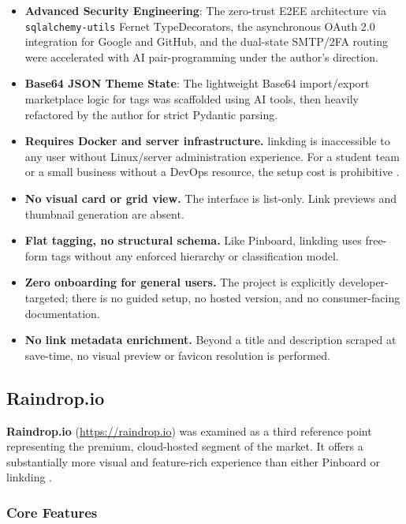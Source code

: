 \documentclass[11pt,a4paper]{book}
\begin{document}
\begin{itemize}
  \item \textbf{Advanced Security Engineering}: The zero-trust E2EE architecture via \texttt{sqlalchemy-utils} Fernet TypeDecorators, the asynchronous OAuth 2.0 integration for Google and GitHub, and the dual-state SMTP/2FA routing were accelerated with AI pair-programming under the author's direction.
  \item \textbf{Base64 JSON Theme State}: The lightweight Base64 import/export marketplace logic for tags was scaffolded using AI tools, then heavily refactored by the author for strict Pydantic parsing.

  \item \textbf{Requires Docker and server infrastructure.} linkding is inaccessible to any user without Linux/server administration experience. For a student team or a small business without a DevOps resource, the setup cost is prohibitive \citep{linkding2020github}.
  \item \textbf{No visual card or grid view.} The interface is list-only. Link previews and thumbnail generation are absent.
  \item \textbf{Flat tagging, no structural schema.} Like Pinboard, linkding uses free-form tags without any enforced hierarchy or classification model.
  \item \textbf{Zero onboarding for general users.} The project is explicitly developer-targeted; there is no guided setup, no hosted version, and no consumer-facing documentation.
  \item \textbf{No link metadata enrichment.} Beyond a title and description scraped at save-time, no visual preview or favicon resolution is performed.
\end{itemize}

\subsection{Raindrop.io}

\textbf{Raindrop.io} (\url{https://raindrop.io}) was examined as a third reference point representing the premium, cloud-hosted segment of the market. It offers a substantially more visual and feature-rich experience than either Pinboard or linkding \citep{raindropio2024}.

\subsubsection{Core Features}
\end{document}
